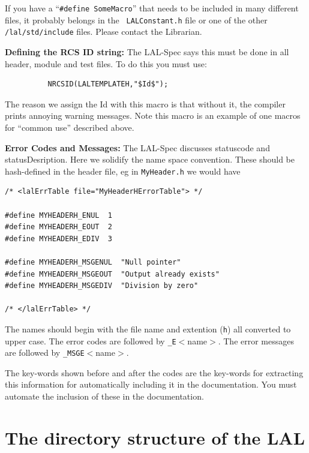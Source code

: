 \documentclass[oneside]{book}
\begin{document}
If you have a ``{\texttt {\#define SomeMacro}}'' that needs to be
included in many different files, it probably belongs in the {\tt
LALConstant.h} file or one of the other {\tt /lal/std/include} files.
Please contact the Librarian.

\bigskip

{\noindent \bf Defining the RCS ID string:}  The LAL-Spec says this
must be done in all header, module and test files. To do this you must
use:
\begin{verbatim}
          NRCSID(LALTEMPLATEH,"$Id$");
\end{verbatim}
\noindent The reason we assign the Id with this macro is that without it,
the compiler prints annoying warning messages. Note this macro is an
example of one macros for ``common use'' described above.

\bigskip

{\noindent \bf Error Codes and Messages:} The LAL-Spec discusses
statuscode and statusDesription. Here we solidify the name space
convention. These should be hash-defined in the header file,
eg in {\tt MyHeader.h} we would have
\begin{verbatim}
/* <lalErrTable file="MyHeaderHErrorTable"> */

#define MYHEADERH_ENUL  1 
#define MYHEADERH_EOUT  2
#define MYHEADERH_EDIV  3

#define MYHEADERH_MSGENUL  "Null pointer"
#define MYHEADERH_MSGEOUT  "Output already exists"
#define MYHEADERH_MSGEDIV  "Division by zero"

/* </lalErrTable> */
\end{verbatim}
\noindent The names should begin with the file name and extention ({\tt h})
all converted to upper case. The error codes are followed by
{\tt \_E}$<$name$>$. The error messages are followed by
{\tt \_MSGE}$<$name$>$.

The key-words shown before and after the codes are the key-words for
extracting this information for automatically including it in the
documentation. You must automate the inclusion of these in the
documentation.

\chapter{The directory structure of the LAL}
\label{c:DirectoryStructure}

\newpage
\end{document}
